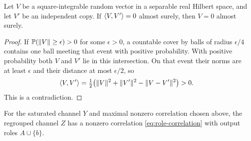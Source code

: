 \begin{lemma}\label{lem:independent-hilbert-vectors}
Let $V$ be a square-integrable random vector in a separable real
Hilbert space, and let $V'$ be an independent copy. If
$\langle V,V'\rangle=0$ almost surely, then $V=0$ almost surely.
\end{lemma}

\begin{proof}
If $\mathbb P(\lVert V\rVert\ge\epsilon)>0$ for some $\epsilon>0$, a countable
cover by balls of radius $\epsilon/4$ contains one ball meeting that
event with positive probability. With positive probability both $V$
and $V'$ lie in this intersection. On that event their norms are at
least $\epsilon$ and their distance at most $\epsilon/2$, so
\[
 \langle V,V'\rangle
 =\tfrac12\bigl(\lVert V\rVert^2+\lVert V'\rVert^2-\lVert V-V'\rVert^2\bigr)>0.
\]
This is a contradiction.
\end{proof}

\begin{proposition}\label{prop:activation}
For the saturated channel $Y$ and maximal nonzero correlation chosen
above, the regrouped channel $Z$ has a nonzero correlation
\eqref{eq:role-correlation} with output roles $A\cup\{b\}$.
\end{proposition}

